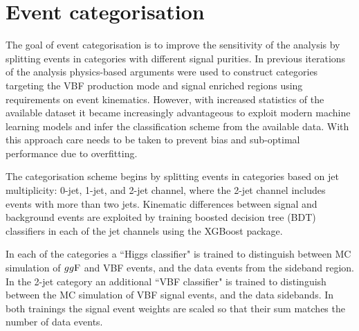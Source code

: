 \section{Event categorisation}

The goal of event categorisation is to improve the sensitivity of the
analysis by splitting events in categories with different signal
purities. In previous iterations of the analysis physics-based
arguments were used to construct categories targeting the VBF 
production mode and signal enriched regions using requirements on
event kinematics. However, with increased statistics of the
available dataset it became increasingly advantageous to exploit
modern machine learning models and infer the classification scheme
from the available data. With this approach care needs to be taken
to prevent bias and sub-optimal performance due to overfitting.

The categorisation scheme begins by splitting events in categories
based on jet multiplicity: 0-jet, 1-jet, and 2-jet channel, where
the 2-jet channel includes events with more than two jets.
Kinematic differences between signal and background events are
exploited by training boosted decision tree (BDT) classifiers in
each of the jet channels using the XGBoost \cite{Chen:2016:XST:2939672.2939785}
package.

In each of the categories a ``Higgs classifier" is trained to
distinguish between MC simulation of $gg\text{F}$ and VBF events, and the
data events from the sideband region. In the 2-jet
category an additional ``VBF classifier" is trained to distinguish
between the MC simulation of VBF signal events, and the data sidebands.
In both trainings the signal event weights are scaled so that their sum
matches the number of data events. 

